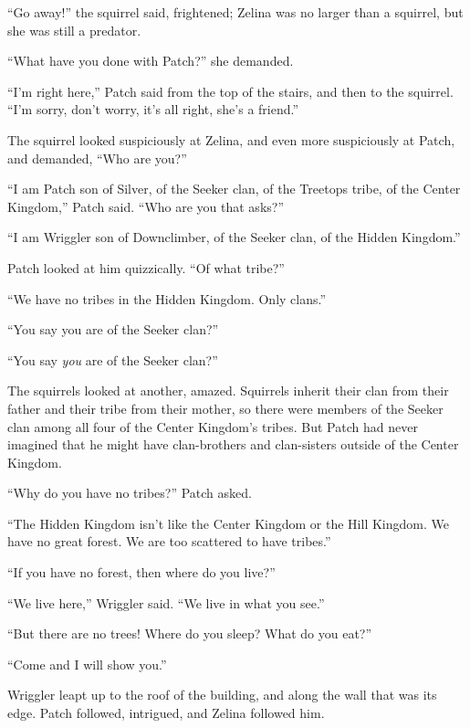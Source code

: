 \documentclass[ebook,oneside,openany,17pt]{memoir}
\newenvironment{tolerant}[1]{%
  \par\tolerance=#1\relax
}{%
  \par
}
\begin{document}
“Go away!” the squirrel said, frightened; Zelina was no larger than a
squirrel, but she was still a predator.

“What have you done with Patch?” she demanded.

“I’m right here,” Patch said from the top of the stairs, and then to
the squirrel. “I’m sorry, don’t worry, it’s all right, she’s a
friend.”

\begin{tolerant}{2000}
The squirrel looked suspiciously at Zelina, and even more suspiciously
at Patch, and demanded, “Who are you?”
\end{tolerant}

“I am Patch son of Silver, of the Seeker clan, of the Treetops tribe,
of the Center Kingdom,” Patch said. “Who are you that asks?”

“I am Wriggler son of Downclimber, of the Seeker clan, of the Hidden
Kingdom.”

Patch looked at him quizzically. “Of what tribe?”

“We have no tribes in the Hidden Kingdom. Only clans.”

“You say you are of the Seeker clan?”

“You say \emph{you} are of the Seeker clan?”

The squirrels looked at another, amazed. Squirrels inherit their clan
from their father and their tribe from their mother, so there were
members of the Seeker clan among all four of the Center Kingdom’s
tribes. But Patch had never imagined that he might have clan-brothers
and clan-sisters outside of the Center Kingdom.

“Why do you have no tribes?” Patch asked.

“The Hidden Kingdom isn’t like the Center Kingdom or the Hill
Kingdom. We have no great forest. We are too scattered to have
tribes.”

“If you have no forest, then where do you live?”

“We live here,” Wriggler said. “We live in what you see.”

\begin{tolerant}{2000}
“But there are no trees! Where do you sleep? What do you eat?”
\end{tolerant}

“Come and I will show you.”

Wriggler leapt up to the roof of the building, and along the wall that
was its edge. Patch followed, intrigued, and Zelina followed him.
\end{document}
